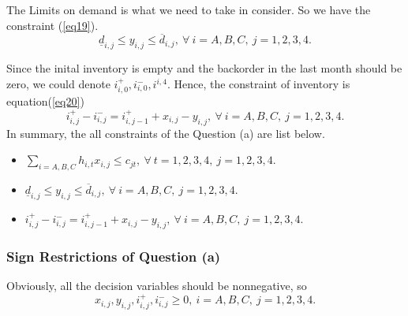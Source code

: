 \documentclass[12pt]{article}
\begin{document}
\noindent The Limits on demand is what we need to take in consider. So we have the constraint (\ref{eq19}).
\begin{equation}
\label{eq19}
\underline{d}_{i,j}\leq y_{i,j}\leq\overline{d}_{i,j},\ \forall\ i=A,B,C,\ j=1,2,3,4.
\end{equation}

\noindent Since the inital inventory is empty and the backorder in the last month should be zero, we could denote $i^+_{i,0},i^-_{i,0},i^{i,4}$. Hence, the constraint of inventory is equation(\ref{eq20})
\begin{equation}
\label{eq20}
i^+_{i,j}-i^-_{i,j}=i^+_{i,j-1}+x_{i,j}-y_{i,j},\ \forall\ i=A,B,C,\ j=1,2,3,4.
\end{equation}
In summary, the all constraints of the Question (a) are list below.
\begin{itemize}
\item $\sum\limits_{i=A,B,C}h_{i,t}x_{i,j}\leq c_{jt},\ \forall\ t=1,2,3,4,\ j=1,2,3,4.$
\item $\underline{d}_{i,j}\leq y_{i,j}\leq\overline{d}_{i,j},\ \forall\ i=A,B,C,\ j=1,2,3,4.$
\item $i^+_{i,j}-i^-_{i,j}=i^+_{i,j-1}+x_{i,j}-y_{i,j},\ \forall\ i=A,B,C,\ j=1,2,3,4.$
\end{itemize}
\subsubsection{Sign Restrictions of Question (a)}
Obviously, all the decision variables should be nonnegative, so
\begin{equation}
\label{eq 21}
x_{i,j},y_{i,j},i^+_{i,j},i^-_{i,j}\geq 0,\ i=A,B,C,\ j=1,2,3,4.
\end{equation}
\end{document}
